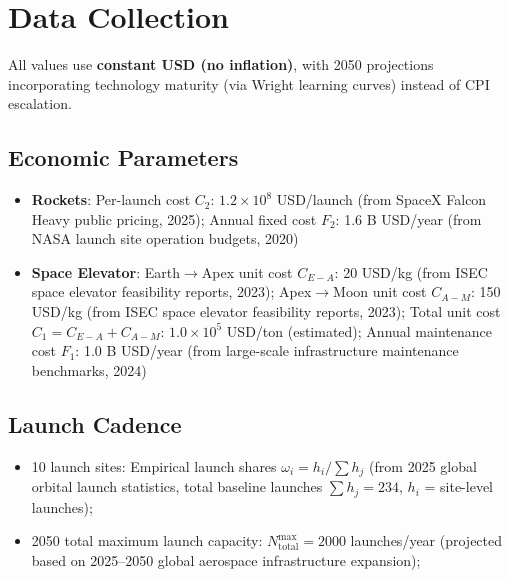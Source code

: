 \documentclass{mcmthesis}
\begin{document}
\section{Data Collection}
\label{sec:data}

All values use \textbf{constant USD (no inflation)}, with 2050 projections incorporating technology maturity (via Wright learning curves) instead of CPI escalation.


\subsection{Economic Parameters}
\begin{itemize}
\item \textbf{Rockets}: 
  Per-launch cost $C_2$: $1.2\times 10^8$ USD/launch (from SpaceX Falcon Heavy public pricing, 2025);
  Annual fixed cost $F_2$: 1.6 B USD/year (from NASA launch site operation budgets, 2020)
\item \textbf{Space Elevator}: 
  Earth$\rightarrow$Apex unit cost $C_{E-A}$: 20 USD/kg (from ISEC space elevator feasibility reports, 2023);
  Apex$\rightarrow$Moon unit cost $C_{A-M}$: 150 USD/kg (from ISEC space elevator feasibility reports, 2023);
  Total unit cost $C_1 = C_{E-A} + C_{A-M}$: $1.0\times 10^5$ USD/ton (estimated);
  Annual maintenance cost $F_1$: 1.0 B USD/year (from large-scale infrastructure maintenance benchmarks, 2024)
\end{itemize}


\subsection{Launch Cadence}
\begin{itemize}
\item 10 launch sites: Empirical launch shares $\omega_i = h_i/\sum h_j$ (from 2025 global orbital launch statistics, total baseline launches $\sum h_j = 234$, $h_i$ = site-level launches);
\item 2050 total maximum launch capacity: $N_{\text{total}}^{\max} = 2000$ launches/year (projected based on 2025--2050 global aerospace infrastructure expansion);
\end{itemize}
\end{document}
